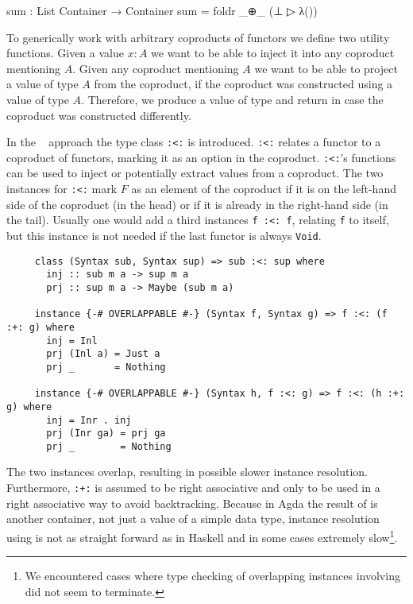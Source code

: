 \begin{code}
sum : List Container → Container
sum = foldr _⊕_ (⊥ ▷ λ())
\end{code}
To generically work with arbitrary coproducts of functors we define two utility
functions.
Given a value $x:A$ we want to be able to inject it into any coproduct
mentioning $A$.
Given any coproduct mentioning $A$ we want to be able to project a value of
type $A$ from the coproduct, if the coproduct was constructed using a value of
type $A$.
Therefore, we produce a value of type
\AgdaSpace{} and return
 in case the coproduct was constructed
differently.

In the
~\cite{DBLP:journals/jfp/Swierstra08}
approach the type class \texttt{:<:} is introduced.
\texttt{:<:} relates a functor to a coproduct of functors, marking it as an
option in the coproduct.
\texttt{:<:}'s functions can be used to inject or potentially extract values
from a coproduct.
The two instances for \texttt{:<:} mark $F$ as an element of the coproduct if
it is on the left-hand side of the coproduct (in the head) or if it is already
in the right-hand side (in the tail).
Usually one would add a third instances \texttt{f :<: f}, relating \texttt{f} to
itself, but this instance is not needed if the last functor is always
\texttt{Void}.

\begin{verbatim}
     class (Syntax sub, Syntax sup) => sub :<: sup where
       inj :: sub m a -> sup m a
       prj :: sup m a -> Maybe (sub m a)

     instance {-# OVERLAPPABLE #-} (Syntax f, Syntax g) => f :<: (f :+: g) where
       inj = Inl
       prj (Inl a) = Just a
       prj _       = Nothing

     instance {-# OVERLAPPABLE #-} (Syntax h, f :<: g) => f :<: (h :+: g) where
       inj = Inr . inj
       prj (Inr ga) = prj ga
       prj _        = Nothing
\end{verbatim}
The two instances overlap, resulting in possible slower instance resolution.
Furthermore, \texttt{:+:} is assumed to be right associative and only to be
used in a right associative way to avoid backtracking.
Because in Agda the result of  is another container, not
just a value of a simple data type, instance resolution using
 is not as straight forward as in Haskell and in some cases
extremely slow\footnote{We encountered cases where type checking of overlapping
instances involving  did not seem to terminate.}.

